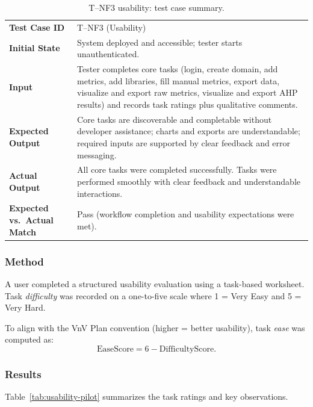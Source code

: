\documentclass[12pt, titlepage]{article}
\begin{document}
\begin{table}[H]
  \centering
  \caption{T--NF3 usability: test case summary.}
  \label{tab:tnf3-summary}
  \begin{tabular}{@{}p{}p{}@{}}
    \toprule
    \textbf{Test Case ID} &
      T--NF3 (Usability) \\
    \textbf{Initial State} &
      System deployed and accessible; tester starts unauthenticated. \\
    \textbf{Input} &
      Tester completes core tasks (login, create domain,
      add metrics, add libraries, fill manual metrics, export data,
      visualize and export raw metrics, visualize and export AHP results)
      and records task ratings plus qualitative comments. \\
    \textbf{Expected Output} &
      Core tasks are discoverable and completable without developer assistance;
      charts and exports are understandable; required inputs are supported by
      clear feedback and error messaging. \\
    \textbf{Actual Output} &
      All core tasks were completed successfully. Tasks were performed
      smoothly with clear feedback and understandable interactions. \\
    \textbf{Expected vs.\ Actual Match} &
      Pass (workflow completion and usability expectations were met). \\
    \bottomrule
  \end{tabular}
\end{table}

\subsubsection{Method}
A user completed a structured usability evaluation using a task-based
worksheet. Task \emph{difficulty} was recorded on a one-to-five scale where
1 = Very Easy and 5 = Very Hard.

To align with the VnV Plan convention (higher = better usability), task
\emph{ease} was computed as:
\[
  \text{EaseScore} = 6 - \text{DifficultyScore}.
\]

\subsubsection{Results}
Table~\ref{tab:usability-pilot} summarizes the task ratings and key observations.
\end{document}
